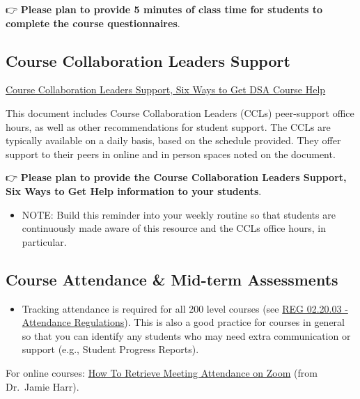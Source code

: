 \documentclass[
]{book}
\providecommand{\tightlist}{%
  \setlength{\itemsep}{0pt}\setlength{\parskip}{0pt}}
\begin{document}
👉 { \textbf{Please plan to provide 5 minutes of class time for students to complete the course questionnaires}. }

\subsection{Course Collaboration Leaders Support}\label{course-collaboration-leaders-support}

\href{https://docs.google.com/document/d/1HHNjCbm_W4CEdBWgecMDRpI64hqvmsZZ1Tq8qpudjWo/edit?usp=sharing}{Course Collaboration Leaders Support, Six Ways to Get DSA Course Help}

This document includes Course Collaboration Leaders (CCLs) peer-support office hours, as well as other recommendations for student support. The CCLs are typically available on a daily basis, based on the schedule provided. They offer support to their peers in online and in person spaces noted on the document.

👉 { \textbf{Please plan to provide the Course Collaboration Leaders Support, Six Ways to Get Help information to your students}. }

\begin{itemize}
\tightlist
\item
  NOTE: Build this reminder into your weekly routine so that students are continuously made aware of this resource and the CCLs office hours, in particular.
\end{itemize}

\subsection{Course Attendance \& Mid-term Assessments}\label{course-attendance-mid-term-assessments}

\begin{itemize}
\tightlist
\item
  Tracking attendance is required for all 200 level courses (see \href{https://policies.ncsu.edu/regulation/reg-02-20-03-attendance-regulations/}{REG 02.20.03 - Attendance Regulations}). This is also a good practice for courses in general so that you can identify any students who may need extra communication or support (e.g., Student Progress Reports).
\end{itemize}

For online courses: \href{https://drive.google.com/file/d/19vuYwyGcMrrBjQVzWbaDph1aHUR7u2bu/view?usp=drive_link}{How To Retrieve Meeting Attendance on Zoom} (from Dr.~Jamie Harr).
\end{document}
